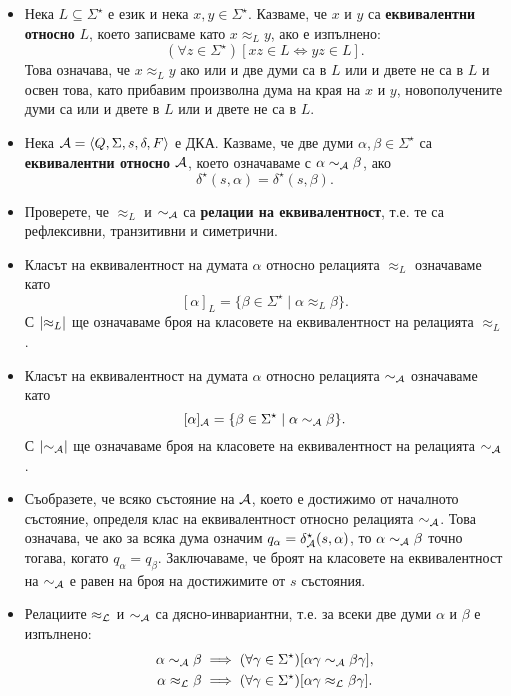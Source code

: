 \begin{itemize}
\item
  Нека $L \subseteq \Sigma^\star$ е език и нека $x,y \in \Sigma^\star$.
  Казваме, че $x$ и $y$ са {\bf еквивалентни относно} $L$, което записваме 
  като $x \approx_L y$, ако е изпълнено:
  \[(\forall z \in \Sigma^\star)[xz \in L \iff yz \in L].\]
  Това означава, че $x\approx_L y$ ако или и две думи са в $L$ или и двете не са в $L$
  и освен това, като прибавим произволна дума на края на $x$ и $y$, новополучените
  думи са или и двете в $L$ или и двете не са в $L$.  
\item
  Нека $\mathcal{A} = \langle{Q,\Sigma,s,\delta,F}\rangle$ е ДКА.
  Казваме, че две думи $\alpha,\beta \in \Sigma^\star$ са {\bf еквивалентни относно $\mathcal{A}$},
  което означаваме с $\alpha \sim_{\mathcal{A}} \beta$, ако 
  \[\delta^\star(s,\alpha) = \delta^\star(s,\beta).\]
\item
  Проверете, че $\approx_L$ и $\sim_{\mathcal{A}}$ са {\bf релации на еквивалентност}, т.е.
  те са рефлексивни, транзитивни и симетрични.
\item
  Класът на еквивалентност на думата $\alpha$ относно релацията $\approx_L$ означаваме като
  \[[\alpha]_L = \{\beta \in \Sigma^\star \mid \alpha \approx_L \beta\}.\]
  С $\lvert{\approx_L}\rvert$ ще означаваме броя на класовете на еквивалентност на релацията $\approx_L$.
\item
  Класът на еквивалентност на думата $\alpha$ относно релацията $\sim_{\mathcal{A}}$ означаваме като
  \[[\alpha]_{\mathcal{A}} = \{\beta \in \Sigma^\star \mid \alpha \sim_{\mathcal{A}} \beta\}.\]
  С $\lvert{\sim_{\mathcal{A}}}\rvert$ ще означаваме броя на класовете на еквивалентност на релацията $\sim_{\mathcal{A}}$.
\item
  Съобразете, че всяко състояние на $\mathcal{A}$, което е достижимо от началното състояние, определя клас на еквивалентност относно 
  релацията $\sim_{\mathcal{A}}$. Това означава, че ако за всяка дума означим  $q_\alpha = \delta^\star_{\mathcal{A}}(s,\alpha)$, то
  $\alpha \sim_{\mathcal{A}} \beta$ точно тогава, когато $q_\alpha = q_\beta$. Заключаваме, че броят на класовете на еквивалентност
  на $\sim_{\mathcal{A}}$ е равен на броя на достижимите от $s$ състояния.
\item
  Релациите $\approx_{\mathcal{L}}$ и $\sim_{\mathcal{A}}$ са дясно-инвариантни, т.е. за всеки две думи $\alpha$ и $\beta$
  е изпълнено:
  \begin{align*}
    \alpha \sim_{\mathcal{A}} \beta  &\implies (\forall \gamma\in\Sigma^\star)[\alpha\gamma \sim_{\mathcal{A}} \beta\gamma],\\
    \alpha \approx_{\mathcal{L}} \beta & \implies (\forall \gamma\in\Sigma^\star)[\alpha\gamma \approx_{\mathcal{L}} \beta\gamma].
  \end{align*}
\end{itemize}

